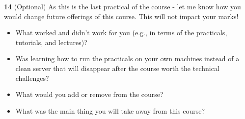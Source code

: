 \documentclass[
]{article}
\begin{document}
\textbf{14} (Optional) As this is the last practical of the course - let
me know how you would change future offerings of this course. This will
not impact your marks!

\begin{itemize}
\item
  What worked and didn't work for you (e.g., in terms of the practicals,
  tutorials, and lectures)?
\item
  Was learning how to run the practicals on your own machines instead of
  a clean server that will disappear after the course worth the
  technical challenges?
\item
  What would you add or remove from the course?
\item
  What was the main thing you will take away from this course?
\end{itemize}
\end{document}
